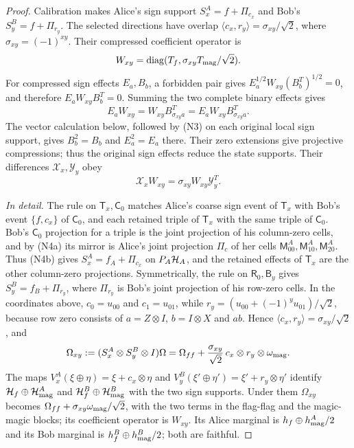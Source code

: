 \begin{proof}
Calibration makes Alice's sign support $S_x^A=f+\Pi_{c_x}$ and Bob's $S_y^B=f+\Pi_{r_y}$. The selected directions have overlap $\langle c_x,r_y\rangle=\sigma_{xy}/\sqrt2$, where $\sigma_{xy}=(-1)^{xy}$. Their compressed coefficient operator is
\[
 W_{xy}=\operatorname{diag}(T_f,\sigma_{xy}T_{\rm mag}/\sqrt2).
\]
For compressed sign effects $E_a,B_b$, a forbidden pair gives
$E_a^{1/2}W_{xy}(B_b^T)^{1/2}=0$, and therefore $E_aW_{xy}B_b^T=0$. Summing the two complete binary effects gives
\[
 E_aW_{xy}=W_{xy}B_{\sigma_{xy}a}^T
            =E_aW_{xy}B_{\sigma_{xy}a}^T.
\]
The vector calculation below, followed by (N3) on each original
local sign support, gives $B_b^2=B_b$ and $E_a^2=E_a$ there. Their zero extensions give projective compressions; thus the original sign effects reduce the state supports. Their differences $\mathcal X_x,\mathcal Y_y$ obey
\begin{equation}\label{eq:sign}
 \mathcal X_xW_{xy}=\sigma_{xy}W_{xy}\mathcal Y_y^T.
\end{equation}

\emph{In detail.} The rule on $\mathsf T_x,\mathsf C_0$ matches Alice's coarse sign event of $\mathsf T_x$ with Bob's event $\{f,c_x\}$ of $\mathsf C_0$, and each retained triple of $\mathsf T_x$ with the same triple of $\mathsf C_0$. Bob's $\mathsf C_0$ projection for a triple is the joint projection of his column-zero cells, and by (N4a) its mirror is Alice's joint projection $\Pi_c$ of her cells $\mathsf M^A_{00},\mathsf M^A_{10},\mathsf M^A_{20}$. Thus (N4b) gives $S^A_x=f_A+\Pi_{c_x}$ on $P_A\mathcal H_A$, and the retained effects of $\mathsf T_x$ are the other column-zero projections. Symmetrically, the rule on $\mathsf R_0,\mathsf B_y$ gives $S^B_y=f_B+\Pi_{r_y}$, where $\Pi_{r_y}$ is Bob's joint projection of his row-zero cells. In the coordinates above, $c_0=u_{00}$ and $c_1=u_{01}$, while $r_y=(u_{00}+(-1)^yu_{01})/\sqrt2$, because row zero consists of $a=Z\otimes I$, $b=I\otimes X$ and $ab$. Hence $\langle c_x,r_y\rangle=\sigma_{xy}/\sqrt2$, and
\[
 \Omega_{xy}:=(S^A_x\otimes S^B_y\otimes I)\Omega
 =\Omega_{ff}+\frac{\sigma_{xy}}{\sqrt2}\,c_x\otimes r_y\otimes\omega_{\rm mag}.
\]
The maps $V^A_x(\xi\oplus\eta)=\xi+c_x\otimes\eta$ and $V^B_y(\xi'\oplus\eta')=\xi'+r_y\otimes\eta'$ identify $\mathcal H_f\oplus\mathcal H^A_{\rm mag}$ and $\mathcal H^B_f\oplus\mathcal H^B_{\rm mag}$ with the two sign supports. Under them $\Omega_{xy}$ becomes $\Omega_{ff}+\sigma_{xy}\omega_{\rm mag}/\sqrt2$, with the two terms in the flag-flag and the magic-magic blocks; its coefficient operator is $W_{xy}$. Its Alice marginal is $h_f\oplus h^A_{\rm mag}/2$ and its Bob marginal is $h^B_f\oplus h^B_{\rm mag}/2$; both are faithful.


\end{proof}
